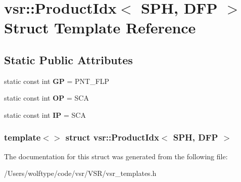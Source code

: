 \hypertarget{structvsr_1_1_product_idx_3_01_s_p_h_00_01_d_f_p_01_4}{\section{vsr\-:\-:Product\-Idx$<$ S\-P\-H, D\-F\-P $>$ Struct Template Reference}
\label{structvsr_1_1_product_idx_3_01_s_p_h_00_01_d_f_p_01_4}
}
\subsection*{Static Public Attributes}
\begin{DoxyCompactItemize}
\item 
\hypertarget{structvsr_1_1_product_idx_3_01_s_p_h_00_01_d_f_p_01_4_adeb7a6912a6b90bad532f85c7a2233cb}{static const int {\bfseries G\-P} = P\-N\-T\-\_\-\-F\-L\-P}\label{structvsr_1_1_product_idx_3_01_s_p_h_00_01_d_f_p_01_4_adeb7a6912a6b90bad532f85c7a2233cb}

\item 
\hypertarget{structvsr_1_1_product_idx_3_01_s_p_h_00_01_d_f_p_01_4_a63172f38206bc84be0ad8d3b9379a671}{static const int {\bfseries O\-P} = S\-C\-A}\label{structvsr_1_1_product_idx_3_01_s_p_h_00_01_d_f_p_01_4_a63172f38206bc84be0ad8d3b9379a671}

\item 
\hypertarget{structvsr_1_1_product_idx_3_01_s_p_h_00_01_d_f_p_01_4_aab30ae7ca45e3b236e93c1b5434dd2da}{static const int {\bfseries I\-P} = S\-C\-A}\label{structvsr_1_1_product_idx_3_01_s_p_h_00_01_d_f_p_01_4_aab30ae7ca45e3b236e93c1b5434dd2da}

\end{DoxyCompactItemize}
\subsubsection*{template$<$$>$ struct vsr\-::\-Product\-Idx$<$ S\-P\-H, D\-F\-P $>$}



The documentation for this struct was generated from the following file\-:\begin{DoxyCompactItemize}
\item 
/\-Users/wolftype/code/vsr/\-V\-S\-R/vsr\-\_\-templates.\-h\end{DoxyCompactItemize}
